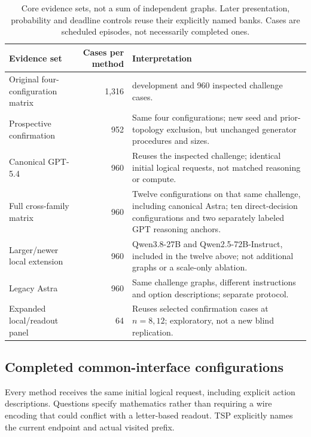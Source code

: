 \begin{table}[t]
\centering\small
\begin{tabular}{>{\raggedright\arraybackslash}p{}r>{\raggedright\arraybackslash}p{}}
\toprule
Evidence set & Cases per method & Interpretation\\
\midrule
Original four-configuration matrix & 1,316 & 356 development and 960
inspected challenge cases.\\
Prospective confirmation & 952 & Same four configurations; new seed and
prior-topology exclusion, but unchanged generator procedures and sizes.\\
Canonical GPT-5.4 & 960 & Reuses the inspected challenge; identical initial
logical requests, not matched reasoning or compute.\\
Full cross-family matrix & 960 & Twelve configurations on that same challenge,
including canonical Astra; ten direct-decision configurations and two
separately labeled GPT reasoning anchors.\\
Larger/newer local extension & 960 & Qwen3.8-27B and Qwen2.5-72B-Instruct,
included in the twelve above; not additional graphs or a scale-only ablation.\\
Legacy Astra & 960 & Same challenge graphs, different instructions and
option descriptions; separate protocol.\\
Expanded local/readout panel & 64 & Reuses selected confirmation cases at
$n=8,12$; exploratory, not a new blind replication.\\
\bottomrule
\end{tabular}
\caption{Core evidence sets, not a sum of independent graphs. Later
presentation, probability and deadline controls reuse their explicitly
named banks. Cases are scheduled episodes, not necessarily completed ones.}
\label{tab:evidence-map}
\end{table}

\subsection{Completed common-interface configurations}
Every method receives the same initial logical request, including explicit
action descriptions. Questions specify mathematics rather than requiring a
wire encoding that could conflict with a letter-based readout. TSP explicitly
names the current endpoint and actual visited prefix.

